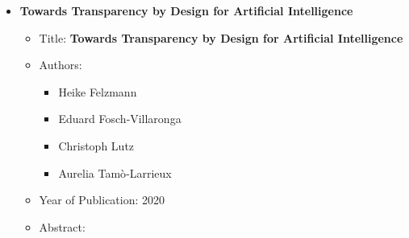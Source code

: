 \documentclass{article}
\begin{document}
\begin{itemize}
\begin{itemize}
\begin{abstract}
            \end{abstract}
        
        \end{itemize}
        
        \item \textbf{Towards Transparency by Design for Artificial Intelligence}
        
        \begin{itemize}
        
            \item Title: \textbf{Towards Transparency by Design for Artificial Intelligence}
        
            \item Authors:
        
            \begin{itemize}
        
                \item Heike Felzmann
        
                \item Eduard Fosch‑Villaronga
        
                \item Christoph Lutz
        
                \item Aurelia Tamò‑Larrieux
        
            \end{itemize}
        
            \item Year of Publication: 2020
        
            \item Abstract:
        
            \begin{abstract}
        

\end{abstract}
\end{itemize}
\end{itemize}
\end{document}
